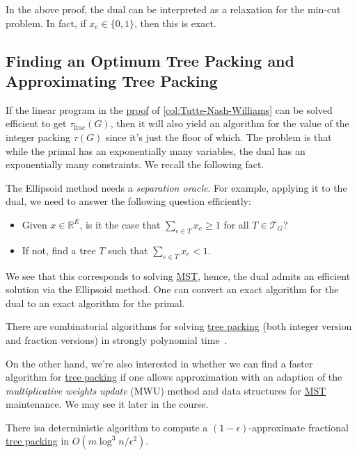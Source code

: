 \begin{remark}
	In the above proof, the dual can be interpreted as a relaxation for the min-cut problem. In fact, if \(x_e \in \{ 0, 1 \} \), then this is exact.
\end{remark}

\subsection{Finding an Optimum Tree Packing and Approximating Tree Packing}
If the linear program in the \hyperref[pf:col:Tutte-Nash-Williams]{proof} of \autoref{col:Tutte-Nash-Williams} can be solved efficient to get \(\tau _{\text{frac} }(G)\), then it will also yield an algorithm for the value of the integer packing \(\tau (G)\) since it's just the floor of which. The problem is that while the primal has an exponentially many variables, the dual has an exponentially many constraints. We recall the following fact.

\begin{prev}
	The Ellipsoid method needs a \emph{separation oracle}. For example, applying it to the dual, we need to answer the following question efficiently:
	\begin{itemize}
		\item Given \(x \in \mathbb{R} ^E\), is it the case that \(\sum_{e \in T} x_e \geq 1\) for all \(T \in \mathcal{T} _G\)?
		\item If not, find a tree \(T\) such that \(\sum_{e \in T} x_e < 1\).
	\end{itemize}
\end{prev}

We see that this corresponds to solving \hyperref[prb:MST]{MST}, hence, the dual admits an efficient solution via the Ellipsoid method. One can convert an exact algorithm for the dual to an exact algorithm for the primal.

\begin{remark}
	There are combinatorial algorithms for solving \hyperref[prb:TP]{tree packing} (both integer version and fraction versions) in strongly polynomial time~\cite{schrijver2003combinatorial}.
\end{remark}

On the other hand, we're also interested in whether we can find a faster algorithm for \hyperref[prb:TP]{tree packing} if one allows approximation with an adaption of the \emph{multiplicative weights update} (MWU) method and data structures for \hyperref[prb:MST]{MST} maintenance. We may see it later in the course.

\begin{theorem}\label{thm:approximate-TP}
	There isa deterministic algorithm to compute a \((1 - \epsilon )\)-approximate fractional \hyperref[prb:TP]{tree packing} in \(O(m \log ^3 n / \epsilon ^2)\).
\end{theorem}